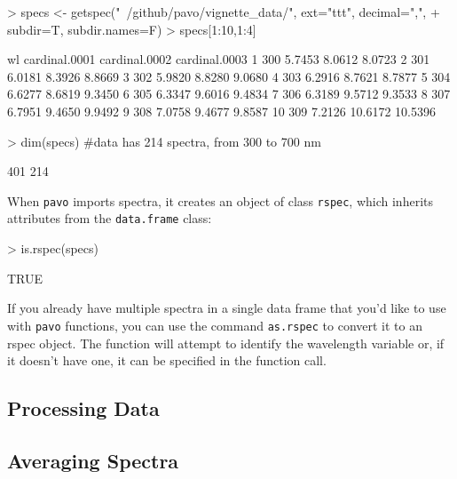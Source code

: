 \documentclass{article}
\newcommand{\pavo}{{\tt pavo}}  %
\newcommand{\code}[1]{{\tt #1}}  %
\begin{document}
\begin{Schunk}
\begin{Sinput}
> specs <- getspec("~/github/pavo/vignette_data/", ext="ttt", decimal=",", 
+                  subdir=T, subdir.names=F)
> specs[1:10,1:4]
\end{Sinput}
\begin{Soutput}
    wl cardinal.0001 cardinal.0002 cardinal.0003
1  300        5.7453        8.0612        8.0723
2  301        6.0181        8.3926        8.8669
3  302        5.9820        8.8280        9.0680
4  303        6.2916        8.7621        8.7877
5  304        6.6277        8.6819        9.3450
6  305        6.3347        9.6016        9.4834
7  306        6.3189        9.5712        9.3533
8  307        6.7951        9.4650        9.9492
9  308        7.0758        9.4677        9.8587
10 309        7.2126       10.6172       10.5396
\end{Soutput}
\begin{Sinput}
> dim(specs) #data has 214 spectra, from 300 to 700 nm
\end{Sinput}
\begin{Soutput}
[1] 401 214
\end{Soutput}
\end{Schunk}

When \pavo{} imports spectra, it creates an object of class \code{rspec}, which inherits attributes from the \code{data.frame} class:
\begin{Schunk}
\begin{Sinput}
> is.rspec(specs)
\end{Sinput}
\begin{Soutput}
[1] TRUE
\end{Soutput}
\end{Schunk}

If you already have multiple spectra in a single data frame that you'd like to use with \pavo{} 
functions, you can use the command \code{as.rspec} to convert it to an rspec object. The 
function will attempt to identify the wavelength variable or, if it doesn't have one, it can be 
specified in the function call.

\subsection{Processing Data}

\subsection{Averaging Spectra}
\end{document}
